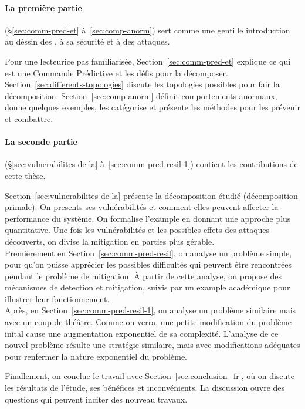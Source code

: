 \documentclass[../main.tex]{subfiles}
\begin{document}
\paragraph{La première partie} (\S\ref{sec:comm-pred-et} à~\ref{sec:comp-anorm}) sert comme une gentille introduction au déssin des \dmpc{}, à sa sécurité et à des attaques.
\newcommand{\tpc}{\textperiodcentered}

Pour un\tpc{}e lecteur\tpc{}ice pas familiarisé\tpc{}e, Section~\ref{sec:comm-pred-et} explique ce qui est une Commande Prédictive et les défis pour la décomposer.
Section~\ref{sec:differents-topologies} discute les topologies possibles pour fair la décomposition.
Section~\ref{sec:comp-anorm} définit comportements anormaux, donne quelques exemples, les catégorise et présente les méthodes pour les prévenir et combattre.

\paragraph{La seconde partie} (\S\ref{sec:vulnerabilites-de-la} à~\ref{sec:comm-pred-resil-1}) contient les contributions de cette thèse.

Section~\ref{sec:vulnerabilites-de-la} présente la décomposition étudié (décomposition primale). On presents ses vulnérabilités et comment elles peuvent affecter la performance du système.
On formalise l'example en donnant une approche plus quantitative.
Une fois les vulnérabilités et les possibles effets des attaques découverts, on divise la mitigation en parties plus gérable.
\\ Premièrement en Section~\ref{sec:comm-pred-resil}, on analyse un problème simple, pour qu'on puisse apprécier les possibles difficultés qui peuvent être rencontrées pendant le problème de mitigation.
À partir de cette analyse, on propose des mécanismes de detection et mitigation, suivis par un example académique pour illustrer leur fonctionnement.
\\Après, en Section~\ref{sec:comm-pred-resil-1}, on analyse un problème similaire mais avec un coup de théâtre. Comme on verra, une petite modification du problème inital cause une augmentation exponentiel de sa complexité.
L'analyse de ce nouvel problème résulte une stratégie similaire, mais avec modifications adéquates pour renfermer la nature exponentiel du problème.

Finallement, on conclue le travail avec Section~\ref{sec:conclusion_fr}, où on discute les résultats de l'étude, ses bénéfices et inconvénients.
La discussion ouvre des questions qui peuvent inciter des nouveau travaux.
\end{document}
